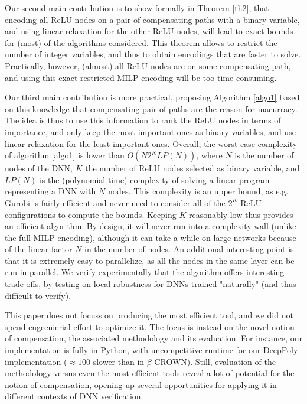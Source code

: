 Our second main contribution is to show formally in Theorem \ref{th2}, that 
encoding all ReLU nodes on a pair of compensating paths with a binary variable,
and using linear relaxation for the other ReLU nodes, will lead to exact bounds for (most) of the algorithms considered. This theorem allows to restrict the number of integer variables, and thus to obtain encodings that are faster to solve. Practically, however, (almost) all ReLU nodes are on some compensating path, and using this exact restricted MILP encoding will be too time consuming.

Our third main contribution is more practical, proposing Algorithm \ref{algo1} based on this knowledge that compensating pair of paths are the reason for inacurracy. The idea is thus to use this information to rank the ReLU nodes in terms of importance, and only keep the most important ones as binary variables, and use linear relaxation for the least important ones.
Overall, the worst case complexity of algorithm \ref{algo1} is lower than $O(N 2^K LP(N))$, where $N$ is the number of nodes of the DNN, $K$ the number of ReLU nodes selected as binary variable, and $LP(N)$ is the (polynomial time) complexity of solving a linear program representing a DNN with $N$ nodes. This complexity is an upper bound, as e.g. Gurobi is fairly efficient and never need to consider all of the $2^K$ ReLU configurations to compute the bounds. Keeping $K$ reasonably low thus provides an efficient algorithm. 
By design, it will never run into a complexity wall (unlike the full MILP encoding), although it can take a while on large networks because of the linear factor $N$ in the number of nodes. An additional interesting point is that it is extremely easy to parallelize, as all the nodes in the same layer can be run in parallel. 
We verify experimentally that the algorithm offers interesting trade offs, by testing on local robustness for DNNs trained "naturally" 
(and thus difficult to verify).



This paper does not focuss on producing the most efficient tool, and we did not spend engeenierial effort to optimize it. The focus is instead on the novel notion of compensation, the associated methodology and its evaluation. For instance, our implementation is fully in Python, with uncompetitive runtime for our DeepPoly implementation ($\approx 100$ slower than in $\beta$-CROWN). Still, evaluation of the methodology versus even the most efficient tools reveal a lot of potential for the notion of compensation, opening up several opportunities for applying it in different contexts of DNN verification. 

